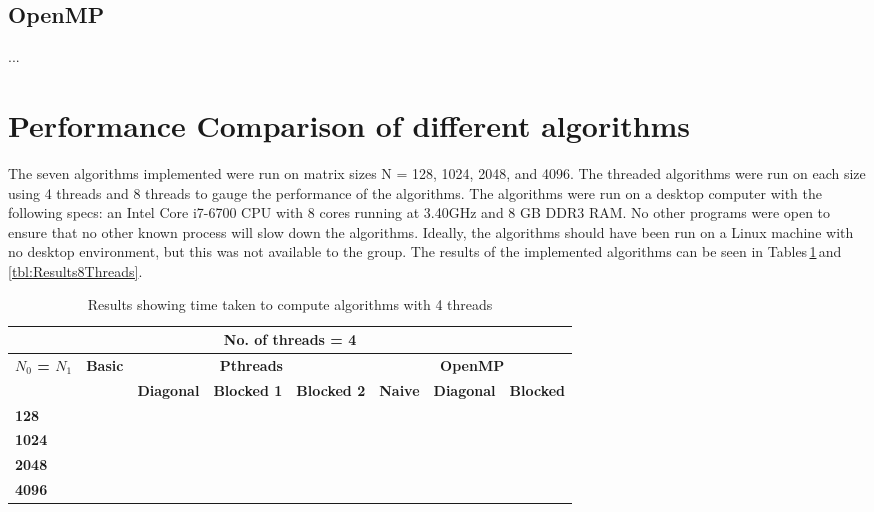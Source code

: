\documentclass[10pt, onecolumn]{article}
\begin{document}
\subsection{OpenMP}
%
...
%
%
\section{Performance Comparison of different algorithms}
The seven algorithms implemented were run on matrix sizes N = 128, 1024, 2048, and 4096. The threaded algorithms were run on each size using 4 threads and 8 threads to gauge the performance of the algorithms. The algorithms were run on a desktop computer with the following specs: an Intel Core i7-6700 CPU with 8 cores running at 3.40GHz and 8 GB DDR3 RAM. No other programs were open to ensure that no other known process will slow down the algorithms. Ideally, the algorithms should have been run on a Linux machine with no desktop environment, but this was not available to the group. The results of the implemented algorithms can be seen in Tables\,\ref{tbl:Results4Threads}\,and\,\ref{tbl:Results8Threads}.
%
\begin{table}[H]
    \vspace{-0.5cm}
    \centering
    \caption{Results showing time taken to compute algorithms with 4 threads}
    \label{tbl:Results4Threads}
    \begin{tabular}{|l|l|l|l|l|l|l|l|}
    \hline
    \multicolumn{8}{|c|}{\textbf{No. of threads = 4}} \\ \hline
    \multirow{2}{*}{\textbf{$N_0$ = $N_1$}} & \multicolumn{1}{c|}{\textbf{Basic}} & \multicolumn{3}{c|}{\textbf{Pthreads}} & \multicolumn{3}{c|}{\textbf{OpenMP}} \\ \cline{2-8} 
     & \textbf{} & \textbf{Diagonal} & \textbf{Blocked 1} & \textbf{Blocked 2} & \textbf{Naive} & \textbf{Diagonal} & \textbf{Blocked} \\ \hline
    \textbf{128}  &  &  &  &  &  &  &  \\ \hline
    \textbf{1024} &  &  &  &  &  &  &  \\ \hline
    \textbf{2048} &  &  &  &  &  &  &  \\ \hline
    \textbf{4096} &  &  &  &  &  &  &  \\ \hline
    \end{tabular}
\end{table}
%
\end{document}
